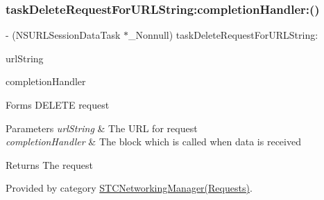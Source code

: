 \subsubsection{\texorpdfstring{task\+Delete\+Request\+For\+U\+R\+L\+String\+:completion\+Handler\+:()}{taskDeleteRequestForURLString:completionHandler:()}}
{\footnotesize\ttfamily -\/ (N\+S\+U\+R\+L\+Session\+Data\+Task $\ast$\+\_\+\+Nonnull) task\+Delete\+Request\+For\+U\+R\+L\+String\+: \begin{DoxyParamCaption}\item[{(N\+S\+String $\ast$\+\_\+\+Nonnull)}]{url\+String }\item[{completionHandler:(void($^\wedge$)(N\+S\+Data $\ast$\+\_\+\+\_\+nullable data, N\+S\+U\+R\+L\+Response $\ast$\+\_\+\+\_\+nullable response, N\+S\+Error $\ast$\+\_\+\+\_\+nullable error))}]{completion\+Handler }\end{DoxyParamCaption}}

Forms D\+E\+L\+E\+TE request


\begin{DoxyParams}{Parameters}
{\em url\+String} & The U\+RL for request \\
\hline
{\em completion\+Handler} & The block which is called when data is received \\
\hline
\end{DoxyParams}
\begin{DoxyReturn}{Returns}
The request 
\end{DoxyReturn}


Provided by category \hyperlink{category_s_t_c_networking_manager_07_requests_08_a7cf3e2d4e1f5b8a1414c392b43ee63bd}{S\+T\+C\+Networking\+Manager(\+Requests)}.

\hypertarget{interface_s_t_c_networking_manager_a46b2c22ca530b473fe9b6e4a5cdb5d7f}{}\label{interface_s_t_c_networking_manager_a46b2c22ca530b473fe9b6e4a5cdb5d7f} 
